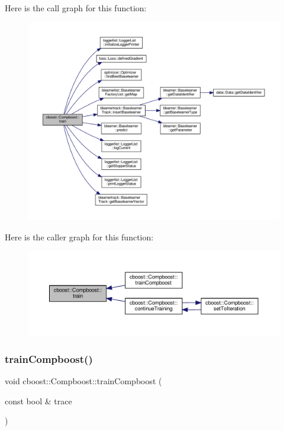 Here is the call graph for this function\+:\nopagebreak
\begin{figure}[H]
\begin{center}
\leavevmode
\includegraphics[width=350pt]{classcboost_1_1_compboost_aa898572eb2c83e0b95c12788a859333b_cgraph}
\end{center}
\end{figure}
Here is the caller graph for this function\+:\nopagebreak
\begin{figure}[H]
\begin{center}
\leavevmode
\includegraphics[width=350pt]{classcboost_1_1_compboost_aa898572eb2c83e0b95c12788a859333b_icgraph}
\end{center}
\end{figure}
\mbox{\label{classcboost_1_1_compboost_a52ea04dec53c68865fdc4a79461d17cb}} 
\subsubsection{\texorpdfstring{train\+Compboost()}{trainCompboost()}}
{\footnotesize\ttfamily void cboost\+::\+Compboost\+::train\+Compboost (\begin{DoxyParamCaption}\item[{const bool \&}]{trace }\end{DoxyParamCaption})}


